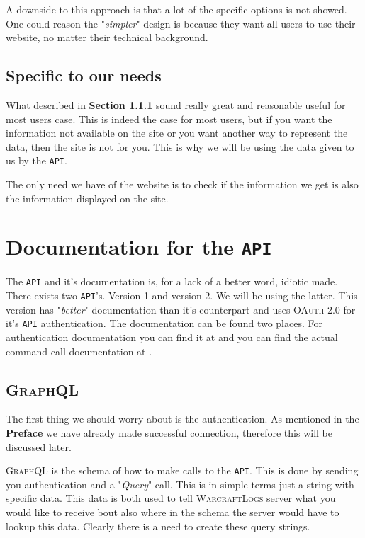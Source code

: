 \documentclass[10pt, a4paper]{memoir}
\numberwithin{equation}{section}
\theoremstyle{plain}
\theoremstyle{defp}
\theoremstyle{dotless}
\theoremstyle{definition}
\theoremstyle{dotless}
\theoremstyle{dotless}
\theoremstyle{defp}
\theoremstyle{defp}
\theoremstyle{be}          %
\theoremstyle{defp}
\newcommand\ttt[1]{\texttt{#1}}
\begin{document}
\medskip

A downside to this approach is that a lot of the specific options is not showed. One could reason the "\textit{simpler}" design is because they want all users to use their website, no matter their technical background. 

\subsection{Specific to our needs}

What described in \textbf{Section 1.1.1} sound really great and reasonable useful for most users case. This is indeed the case for most users, but if you want the information not available on the site or you want another way to represent the data, then the site is not for you. This is why we will be using the data given to us by the \ttt{API}.

\medskip

The only need we have of the website is to check if the information we get is also the information displayed on the site.  

\section{Documentation for the \ttt{API}}\label{sec:Doc}

The \ttt{API} and it's documentation is, for a lack of a better word, idiotic made. There exists two \ttt{API}'s. Version 1 and version 2. We will be using the latter. This version has "\textit{better}" documentation than it's counterpart and uses \textsc{OAuth 2.0} for it's \ttt{API} authentication. The documentation can be found two places. For authentication documentation you can find it at \cite{AuthLink} and you can find the actual command call documentation at \cite{DocLink}.

\subsection{\textsc{GraphQL}}

The first thing we should worry about is the authentication. As mentioned in the \textbf{Preface} we have already made successful connection, therefore this will be discussed later.  

\medskip

\textsc{GraphQL} is the schema of how to make calls to the \ttt{API}. This is done by sending you authentication and a "\textit{Query}" call. This is in simple terms just a string with specific data. This data is both used to tell \textsc{WarcraftLogs} server what you would like to receive bout also where in the schema the server would have to lookup this data. Clearly there is a need to create these query strings. 
\end{document}
